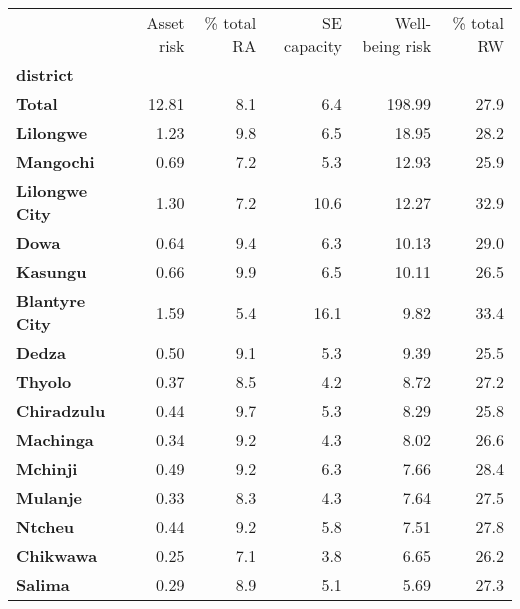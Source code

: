 \begin{tabular}{lrrrrr}
\toprule
{} &  Asset risk &  \% total RA &  SE capacity &  Well-being risk &  \% total RW \\
\textbf{district      } &             &             &              &                  &             \\
\midrule
\textbf{Total         } &       12.81 &         8.1 &          6.4 &           198.99 &        27.9 \\
\textbf{Lilongwe      } &        1.23 &         9.8 &          6.5 &            18.95 &        28.2 \\
\textbf{Mangochi      } &        0.69 &         7.2 &          5.3 &            12.93 &        25.9 \\
\textbf{Lilongwe City } &        1.30 &         7.2 &         10.6 &            12.27 &        32.9 \\
\textbf{Dowa          } &        0.64 &         9.4 &          6.3 &            10.13 &        29.0 \\
\textbf{Kasungu       } &        0.66 &         9.9 &          6.5 &            10.11 &        26.5 \\
\textbf{Blantyre City } &        1.59 &         5.4 &         16.1 &             9.82 &        33.4 \\
\textbf{Dedza         } &        0.50 &         9.1 &          5.3 &             9.39 &        25.5 \\
\textbf{Thyolo        } &        0.37 &         8.5 &          4.2 &             8.72 &        27.2 \\
\textbf{Chiradzulu    } &        0.44 &         9.7 &          5.3 &             8.29 &        25.8 \\
\textbf{Machinga      } &        0.34 &         9.2 &          4.3 &             8.02 &        26.6 \\
\textbf{Mchinji       } &        0.49 &         9.2 &          6.3 &             7.66 &        28.4 \\
\textbf{Mulanje       } &        0.33 &         8.3 &          4.3 &             7.64 &        27.5 \\
\textbf{Ntcheu        } &        0.44 &         9.2 &          5.8 &             7.51 &        27.8 \\
\textbf{Chikwawa      } &        0.25 &         7.1 &          3.8 &             6.65 &        26.2 \\
\textbf{Salima        } &        0.29 &         8.9 &          5.1 &             5.69 &        27.3 \\

\end{tabular}
